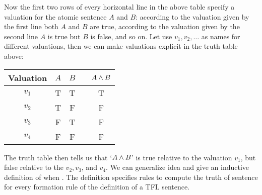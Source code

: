 Now the first two rows of every horizontal line in the above table specify a valuation for the atomic sentence $A$ and $B$: according to the valuation given by the first line both $A$ and $B$ are true, according to the valuation given by the second line $A$ is true but $B$ is false, and so on. Let use $v_1,v_2,\ldots$ as names for different valuations, then we can make valuations explicit in the truth table above:
\begin{center}
\begin{tabular}{c|ccc|c}
Valuation&$A$&$B$&&$A\mathbin{\wedge} B$\\\hline
$v_1$&T & T && T\\
$v_2$&T & F && F\\
$v_3$&F & T && F\\
$v_4$&F & F && F
\end{tabular}
\end{center}

 The truth table then tells us that `$A\mathbin{\wedge} B$' is true relative to the valuation $v_1$, but false relative to the $v_2,v_3$, and $v_4$. We can generalize idea and give an inductive definition of when .  The definition specifies rules to compute the truth of sentence for every formation rule of the definition of a TFL sentence.


